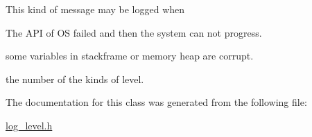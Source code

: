 \begin{Desc}
\begin{description}
This kind of message may be logged when
\begin{DoxyItemize}
\item The A\-P\-I of O\-S failed and then the system can not progress.
\item some variables in stackframe or memory heap are corrupt. 
\end{DoxyItemize}\item[{\em 
\hypertarget{classhryky_1_1log_1_1_level_a9e6bba8f272859b212f49e4478a863d7ad7a9a505788d17fe8ff399bb536bfc08}{num\-\_\-}\label{classhryky_1_1log_1_1_level_a9e6bba8f272859b212f49e4478a863d7ad7a9a505788d17fe8ff399bb536bfc08}
}]the number of the kinds of level. \end{description}
\end{Desc}



The documentation for this class was generated from the following file\-:\begin{DoxyCompactItemize}
\item 
\hyperlink{log__level_8h}{log\-\_\-level.\-h}\end{DoxyCompactItemize}
